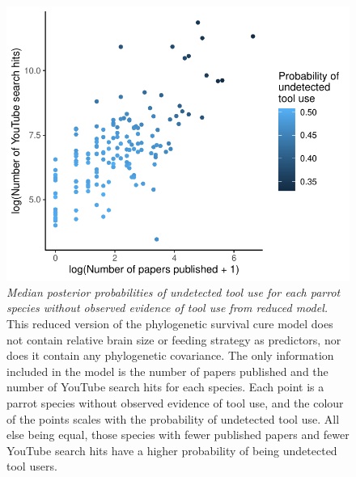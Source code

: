 \documentclass[
  man, donotrepeattitle,floatsintext]{apa6}
\begin{document}
\begin{figure}
\centering
\includegraphics{manuscript_files/figure-latex/plotSurvCure3-1.pdf}
\caption{\label{fig:plotSurvCure3}\emph{Median posterior probabilities of undetected tool use for each parrot species without observed evidence of tool use from reduced model.} This reduced version of the phylogenetic survival cure model does not contain relative brain size or feeding strategy as predictors, nor does it contain any phylogenetic covariance. The only information included in the model is the number of papers published and the number of YouTube search hits for each species. Each point is a parrot species without observed evidence of tool use, and the colour of the points scales with the probability of undetected tool use. All else being equal, those species with fewer published papers and fewer YouTube search hits have a higher probability of being undetected tool users.}
\end{figure}

\newpage
\end{document}

